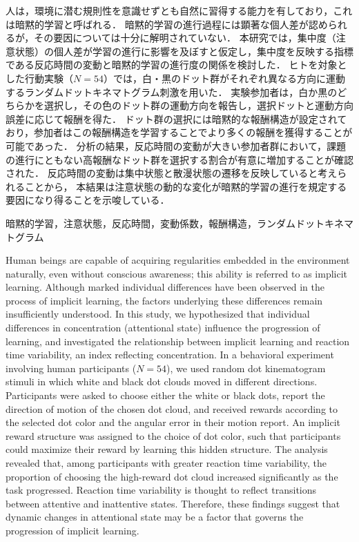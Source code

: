 \begin{jabstract}
人は，環境に潜む規則性を意識せずとも自然に習得する能力を有しており，これは暗黙的学習と呼ばれる．
暗黙的学習の進行過程には顕著な個人差が認められるが，その要因については十分に解明されていない．
本研究では，集中度（注意状態）の個人差が学習の進行に影響を及ぼすと仮定し，集中度を反映する指標である反応時間の変動と暗黙的学習の進行度の関係を検討した．
ヒトを対象とした行動実験（$N=54$）では，白・黒のドット群がそれぞれ異なる方向に運動するランダムドットキネマトグラム刺激を用いた．
実験参加者は，白か黒のどちらかを選択し，その色のドット群の運動方向を報告し，選択ドットと運動方向誤差に応じて報酬を得た．
ドット群の選択には暗黙的な報酬構造が設定されており，参加者はこの報酬構造を学習することでより多くの報酬を獲得することが可能であった．
分析の結果，反応時間の変動が大きい参加者群において，課題の進行にともない高報酬なドット群を選択する割合が有意に増加することが確認された．
反応時間の変動は集中状態と散漫状態の遷移を反映していると考えられることから，
本結果は注意状態の動的な変化が暗黙的学習の進行を規定する要因になり得ることを示唆している．
\end{jabstract}
\begin{jkeyword}
暗黙的学習，注意状態，反応時間，変動係数，報酬構造，ランダムドットキネマトグラム
\end{jkeyword}
\begin{eabstract}
Human beings are capable of acquiring regularities embedded in the environment naturally, even without conscious awareness; this ability is referred to as implicit learning.
Although marked individual differences have been observed in the process of implicit learning, the factors underlying these differences remain insufficiently understood.
In this study, we hypothesized that individual differences in concentration (attentional state) influence the progression of learning, and investigated the relationship between implicit learning and reaction time variability, an index reflecting concentration.
In a behavioral experiment involving human participants ($N = 54$), we used random dot kinematogram stimuli in which white and black dot clouds moved in different directions.
Participants were asked to choose either the white or black dots, report the direction of motion of the chosen dot cloud, and received rewards according to the selected dot color and the angular error in their motion report.
An implicit reward structure was assigned to the choice of dot color, such that participants could maximize their reward by learning this hidden structure.
The analysis revealed that, among participants with greater reaction time variability, the proportion of choosing the high-reward dot cloud increased significantly as the task progressed.
Reaction time variability is thought to reflect transitions between attentive and inattentive states.
Therefore, these findings suggest that dynamic changes in attentional state may be a factor that governs the progression of implicit learning.
\end{eabstract}
